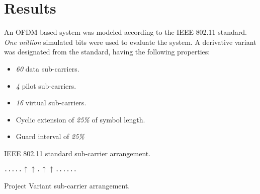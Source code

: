 \chapter{Results}

An OFDM-based system was modeled according to the IEEE 802.11 standard. \emph{One million} simulated bits were used to evaluate the system. A derivative variant was designated from the standard, having the following properties:
\begin{itemize}
	\item \emph{60} data sub-carriers.
	\item \emph{4} pilot sub-carriers.
	\item \emph{16} virtual sub-carriers.
	\item Cyclic extension of \emph{25\%} of symbol length.
	\item Guard interval of \emph{25\%}
\end{itemize}

IEEE 802.11 standard sub-carrier arrangement.
    \begin{center}
      \texttt{.....\textbar \textbar \textbar \textbar \textbar$\uparrow$\textbar \textbar \textbar \textbar \textbar \textbar \textbar \textbar \textbar \textbar \textbar \textbar \textbar \textbar$\uparrow$\textbar \textbar \textbar \textbar \textbar \textbar.\textbar \textbar \textbar \textbar \textbar \textbar$\uparrow$\textbar \textbar \textbar \textbar \textbar \textbar \textbar \textbar \textbar \textbar \textbar \textbar \textbar$\uparrow$\textbar \textbar \textbar \textbar \textbar...... }

    \end{center}
  
Project Variant sub-carrier arrangement.
      \begin{center}
    \end{center}

